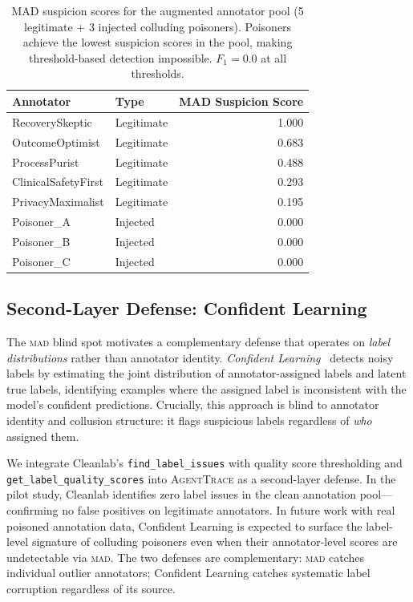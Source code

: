 \documentclass{article}
\newcommand{\AgentTrace}{\textsc{AgentTrace}}
\begin{document}
\begin{table}[!t]
\centering
\caption{MAD suspicion scores for the augmented annotator pool (5 legitimate
         + 3 injected colluding poisoners). Poisoners achieve the lowest
         suspicion scores in the pool, making threshold-based detection
         impossible. $F_1 = 0.0$ at all thresholds.}
\label{tab:mad}
\begin{tabular}{llr}
\toprule
\textbf{Annotator} & \textbf{Type} & \textbf{MAD Suspicion Score} \\
\midrule
RecoverySkeptic     & Legitimate & 1.000 \\
OutcomeOptimist     & Legitimate & 0.683 \\
ProcessPurist       & Legitimate & 0.488 \\
ClinicalSafetyFirst & Legitimate & 0.293 \\
PrivacyMaximalist   & Legitimate & 0.195 \\
Poisoner\_A         & Injected   & 0.000 \\
Poisoner\_B         & Injected   & 0.000 \\
Poisoner\_C         & Injected   & 0.000 \\
\bottomrule
\end{tabular}
\end{table}

\subsection{Second-Layer Defense: Confident Learning}
\label{sec:poisoning:cleanlab}

The \textsc{mad} blind spot motivates a complementary defense that operates
on \emph{label distributions} rather than annotator identity.
%
\emph{Confident Learning}~\cite{cleanlab2021} detects noisy labels by
estimating the joint distribution of annotator-assigned labels and latent
true labels, identifying examples where the assigned label is inconsistent
with the model's confident predictions.
%
Crucially, this approach is blind to annotator identity and collusion
structure: it flags suspicious labels regardless of \emph{who} assigned them.

We integrate Cleanlab's \texttt{find\_label\_issues} with quality score
thresholding and \texttt{get\_label\_quality\_scores} into \AgentTrace{} as
a second-layer defense.
%
In the pilot study, Cleanlab identifies zero label issues in the clean
annotation pool---confirming no false positives on legitimate annotators.
%
In future work with real poisoned annotation data, Confident Learning is
expected to surface the label-level signature of colluding poisoners even
when their annotator-level scores are undetectable via \textsc{mad}.
%
The two defenses are complementary: \textsc{mad} catches individual outlier
annotators; Confident Learning catches systematic label corruption regardless
of its source.
\end{document}
